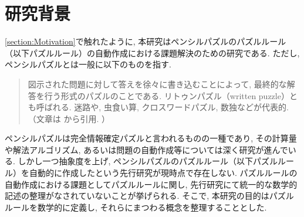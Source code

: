 \section{研究背景}\label{section:Introduction}

\cref{section:Motivation}で触れたように, 本研究はペンシルパズルのパズルルール（以下パズルルール）の自動作成における課題解決のための研究である. ただし, ペンシルパズルとは一般に以下のものを指す.
\begin{quote}
  図示された問題に対して答えを徐々に書き込むことによって, 最終的な解答を行う形式のパズルのことである. リトゥンパズル（written puzzle）とも呼ばれる. 迷路や, 虫食い算, クロスワードパズル, 数独などが代表的. （文章は \cite{web:PencilPuzzle}から引用. ）
\end{quote}
ペンシルパズルは完全情報確定パズルと言われるものの一種であり, その計算量や解法アルゴリズム, あるいは問題の自動作成等については深く研究が進んでいる. しかし一つ抽象度を上げ, ペンシルパズルのパズルルール（以下パズルルール）を自動的に作成したという先行研究が現時点で存在しない.
パズルルールの自動作成における課題としてパズルルールに関し, 先行研究にて統一的な数学的記述の整理がなされていないことが挙げられる. そこで, 本研究の目的はパズルルールを数学的に定義し, それらにまつわる概念を整理することとした.

